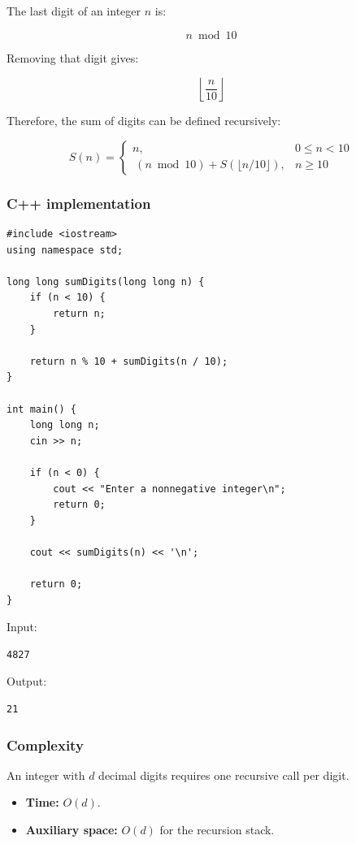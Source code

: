 The last digit of an integer $n$ is:


\[
n\bmod10
\]


Removing that digit gives:


\[
\left\lfloor\frac n{10}\right\rfloor
\]


Therefore, the sum of digits can be defined recursively:


\[
\boxed{ S(n)= \begin{cases} n,&0\leq n<10\\\ (n\bmod10)+S(\lfloor n/10\rfloor),&n\geq10 \end{cases} }
\]


\subsubsection{C++ implementation}

\begin{lstlisting}[style=cppstyle]
#include <iostream>
using namespace std;

long long sumDigits(long long n) {
    if (n < 10) {
        return n;
    }

    return n % 10 + sumDigits(n / 10);
}

int main() {
    long long n;
    cin >> n;

    if (n < 0) {
        cout << "Enter a nonnegative integer\n";
        return 0;
    }

    cout << sumDigits(n) << '\n';

    return 0;
}
\end{lstlisting}

Input:

\begin{lstlisting}[style=pseudocode]
4827
\end{lstlisting}

Output:

\begin{lstlisting}[style=pseudocode]
21
\end{lstlisting}

\subsubsection{Complexity}

An integer with $d$ decimal digits requires one recursive call per digit.

\begin{itemize}
    \item \textbf{Time:} $O(d)$.
    \item \textbf{Auxiliary space:} $O(d)$ for the recursion stack.
\end{itemize}

